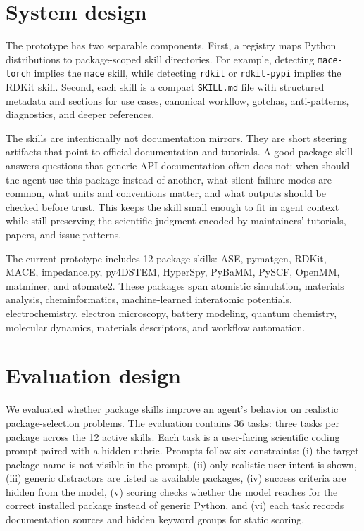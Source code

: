 \documentclass[11pt]{article}
\begin{document}
\section{System design}

The prototype has two separable components. First, a registry maps Python distributions to package-scoped skill directories. For example, detecting \texttt{mace-torch} implies the \texttt{mace} skill, while detecting \texttt{rdkit} or \texttt{rdkit-pypi} implies the RDKit skill. Second, each skill is a compact \texttt{SKILL.md} file with structured metadata and sections for use cases, canonical workflow, gotchas, anti-patterns, diagnostics, and deeper references.

The skills are intentionally not documentation mirrors. They are short steering artifacts that point to official documentation and tutorials. A good package skill answers questions that generic API documentation often does not: when should the agent use this package instead of another, what silent failure modes are common, what units and conventions matter, and what outputs should be checked before trust. This keeps the skill small enough to fit in agent context while still preserving the scientific judgment encoded by maintainers' tutorials, papers, and issue patterns.

The current prototype includes 12 package skills: ASE, pymatgen, RDKit, MACE, impedance.py, py4DSTEM, HyperSpy, PyBaMM, PySCF, OpenMM, matminer, and atomate2. These packages span atomistic simulation, materials analysis, cheminformatics, machine-learned interatomic potentials, electrochemistry, electron microscopy, battery modeling, quantum chemistry, molecular dynamics, materials descriptors, and workflow automation.

\section{Evaluation design}

We evaluated whether package skills improve an agent's behavior on realistic package-selection problems. The evaluation contains 36 tasks: three tasks per package across the 12 active skills. Each task is a user-facing scientific coding prompt paired with a hidden rubric. Prompts follow six constraints: (i) the target package name is not visible in the prompt, (ii) only realistic user intent is shown, (iii) generic distractors are listed as available packages, (iv) success criteria are hidden from the model, (v) scoring checks whether the model reaches for the correct installed package instead of generic Python, and (vi) each task records documentation sources and hidden keyword groups for static scoring.
\end{document}
